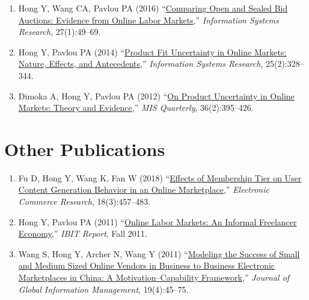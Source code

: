 \documentclass[paper=letter,fontsize=10pt]{scrartcl} %
\newcommand{\NewPart}[2]{\section*{{#1} #2}}
\newcommand{\PaperEntry}[6]{
		\noindent #1 (#2) ``\href{#6}{#3},'' \textit{#4}, #5.} %
\newcommand{\Hong}{Hong Y}
\begin{document}
\begin{enumerate}
\item \PaperEntry{\Hong, Wang CA, Pavlou PA}{2016}{Comparing Open and Sealed Bid Auctions: Evidence from Online Labor Markets}{Information Systems Research}{27(1):49--69}{https://doi.org/10.1287/isre.2015.0606}

\item \PaperEntry{\Hong, Pavlou PA}{2014}{Product Fit Uncertainty in Online Markets: Nature, Effects, and Antecedents}{Information Systems Research}{25(2):328--344}{https://doi.org/10.1287/isre.2014.0520}

\item \PaperEntry{Dimoka A, \Hong, Pavlou PA}{2012}{On Product Uncertainty in Online Markets: Theory and Evidence}{MIS Quarterly}{36(2):395--426}{https://misq.org/on-product-uncertainty-in-online-markets-theory-and-evidence.html}

\end{enumerate}




\NewPart{Other Publications}{}

\begin{enumerate}
\item \PaperEntry{Fu D, \Hong, Wang K, Fan W}{2018}{Effects of Membership Tier on User Content Generation Behavior in an Online Marketplace}{Electronic Commerce Research}{18(3):457--483}{https://link.springer.com/article/10.1007/s10660-017-9266-7}

\item \PaperEntry{\Hong, Pavlou PA}{2011}{Online Labor Markets: An Informal Freelancer Economy}{IBIT Report}{Fall 2011}{https://papers.ssrn.com/sol3/papers.cfm?abstract_id=2132869}

\item \PaperEntry{Wang S, \Hong, Archer N, Wang Y}{2011}{Modeling the Success of Small and Medium Sized Online Vendors in Business to Business Electronic Marketplaces in China: A Motivation--Capability Framework}{Journal of Global Information Management}{19(4):45--75}{https://www.igi-global.com/article/modeling-success-small-medium-sized/58551}

\end{enumerate}


\end{document}
